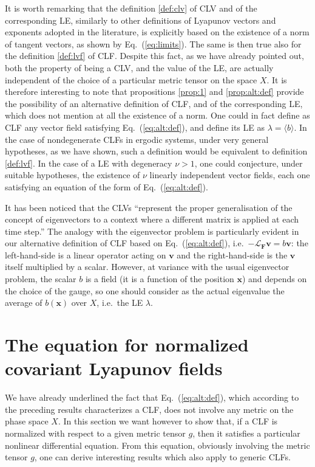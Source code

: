 \documentclass{article}
\theoremstyle{plain}
\theoremstyle{definition}
\theoremstyle{remark}
\newcommand{\vect}[1]{\boldsymbol{#1}}
\providecommand{\detail}[1]{#1}
\renewcommand{\detail}[1]{}
\begin{document}
It is worth remarking that the definition \ref{def:clv} of
CLV and of the corresponding LE, similarly to other definitions of
Lyapunov vectors and exponents adopted in the literature, is
explicitly based on the existence of a norm of tangent vectors, as shown by
Eq.~(\ref{eq:limits}).  The same is then true also for the definition
\ref{def:lvf} of CLF.  Despite this fact, as we have already pointed
out, both the property of being a CLV, and the value of the LE, are
actually independent of the choice of a particular metric tensor on
the space $X$.
It is therefore interesting to note that propositions \ref{prop:1} and
\ref{prop:alt:def} provide the possibility of an alternative
definition of CLF, and of the corresponding LE, which does not mention
at all the existence of a norm. One could in fact define as CLF any
vector field satisfying Eq.~(\ref{eq:alt:def}), and define its LE as
$\lambda=\langle b\rangle$.  In the case of nondegenerate CLFs in
ergodic systems, under very general hypotheses, as we have shown,
such a definition would be equivalent to definition
\ref{def:lvf}. In the case of a LE with degeneracy $\nu>1$, one could
conjecture, under suitable hypotheses, the existence of $\nu$ linearly
independent vector fields, each one satisfying an equation of the form
of Eq.~(\ref{eq:alt:def}).

It has been noticed that the CLVs ``represent the proper
generalisation of the concept of eigenvectors to a context where a
different matrix is applied at each time step.'' \cite{pikovsky}
\detail{page 58} The analogy with the eigenvector problem is
particularly evident in our alternative definition of CLF based on
Eq.~(\ref{eq:alt:def}), 
i.e.\ $-\mathcal{L}_{\vect{F}} \vect{v} =b \vect v$:
the left-hand-side is a linear operator acting on
$\vect{v}$ and the right-hand-side is the $\vect v$ itself multiplied by
a scalar. However, at variance with the usual eigenvector problem, the
scalar $b$ is a field (it is a function of the position $\vect{x}$) 
and depends on the choice of the gauge, so one should consider
as the actual eigenvalue 
the average of $b(\vect{x})$ over $X$, i.e.\ the LE $\lambda$.

\section{The equation for normalized covariant Lyapunov fields}
\label{prop:norm}

We have already underlined the fact that Eq.~(\ref{eq:alt:def}),
which according to the preceding results characterizes a CLF, does not
involve any metric on the phase space $X$. In this section we want
however to show that, if a CLF is normalized with respect
to a given metric tensor $g$, then it satisfies
a particular nonlinear differential equation. From this
equation, obviously involving the metric tensor $g$, one can derive
interesting results which also apply to generic CLFs.
\end{document}
